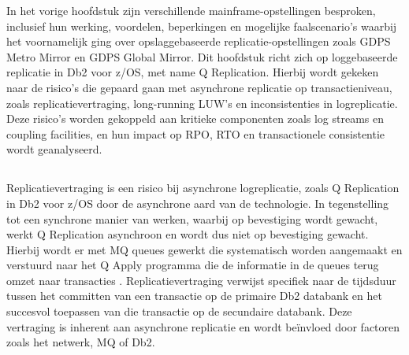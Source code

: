 In het vorige hoofdstuk zijn verschillende mainframe-opstellingen besproken, inclusief hun werking, voordelen, beperkingen en mogelijke faalscenario's waarbij het voornamelijk ging over opslaggebaseerde replicatie-opstellingen zoals GDPS Metro Mirror en GDPS Global Mirror.
Dit hoofdstuk richt zich op loggebaseerde replicatie in Db2 voor z/OS, met name Q Replication.
Hierbij wordt gekeken naar de risico's die gepaard gaan met asynchrone replicatie op transactieniveau, zoals replicatievertraging, long-running LUW's en inconsistenties in logreplicatie.
Deze risico's worden gekoppeld aan kritieke componenten zoals log streams en coupling facilities, en hun impact op RPO, RTO en transactionele consistentie wordt geanalyseerd.

\subsection{}
\label{sec:asynchrone-log-replicatie-vertraging}

Replicatievertraging is een risico bij asynchrone logreplicatie, zoals Q Replication in Db2 voor z/OS door de asynchrone aard van de technologie.
In tegenstelling tot een synchrone manier van werken, waarbij op bevestiging wordt gewacht, werkt Q Replication asynchroon en wordt dus niet op bevestiging gewacht.
Hierbij wordt er met MQ queues gewerkt die systematisch worden aangemaakt en verstuurd naar het Q Apply programma die de informatie in de queues terug omzet naar transacties \autocite{ibm_2026_infosphere_q_replication}.
Replicatievertraging verwijst specifiek naar de tijdsduur tussen het committen van een transactie op de primaire Db2 databank en het succesvol toepassen van die transactie op de secundaire databank.
Deze vertraging is inherent aan asynchrone replicatie en wordt beïnvloed door factoren zoals het netwerk, MQ of Db2.

